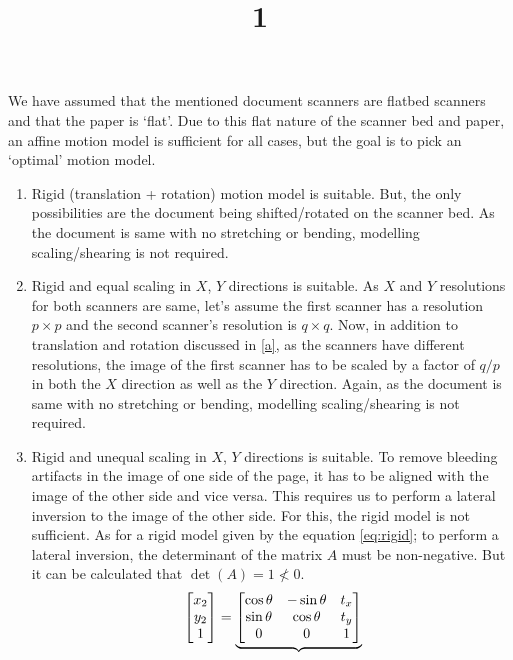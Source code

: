 \documentclass[a4paper]{article}
\title{1\vspace{-2em}}
\date{}
\begin{document}
\maketitle
We have assumed that the mentioned document scanners are flatbed scanners and that the paper is `flat'. Due to this flat nature of the scanner bed and paper, an affine motion model is sufficient for all cases, but the goal is to pick an `optimal' motion model.
\begin{enumerate}[label=(\alph*)]
	\item \label{a} Rigid (translation + rotation) motion model is suitable. But, the only possibilities are the document being shifted/rotated on the scanner bed. As the document is same with no stretching or bending, modelling scaling/shearing is not required.
	\item Rigid and equal scaling in $X$, $Y$ directions is suitable. As $X$ and $Y$ resolutions for both scanners are same, let's assume the first scanner has a resolution $p \times p$ and the second scanner's resolution is $q \times q$. Now, in addition to translation and rotation discussed in \ref{a}, as the scanners have different resolutions, the image of the first scanner has to be scaled by a factor of $q/p$ in both the $X$ direction as well as the $Y$ direction. Again, as the document is same with no stretching or bending, modelling scaling/shearing is not required.
	\item Rigid and unequal scaling in $X$, $Y$ directions is suitable. To remove bleeding artifacts in the image of one side of the page, it has to be aligned with the image of the other side and vice versa. This requires us to perform a lateral inversion to the image of the other side. For this, the rigid model is not sufficient. As for a rigid model given by the equation \ref{eq:rigid}; to perform a lateral inversion, the determinant of the matrix $A$ must be non-negative. But it can be calculated that $\operatorname{det}(A)=1 \nless 0$.
	\begin{equation}{\label{eq:rigid}}
		\begin{bmatrix}
			x_2\\y_2\\1
		\end{bmatrix}
		=
		\underbrace{
		\begin{bmatrix}
			\cos\theta & -\sin\theta & t_x\\
			\sin\theta & \cos\theta  & t_y\\
			0          & 0           & 1\\
		\end{bmatrix}
}
\end{equation}
\end{enumerate}
\end{document}
